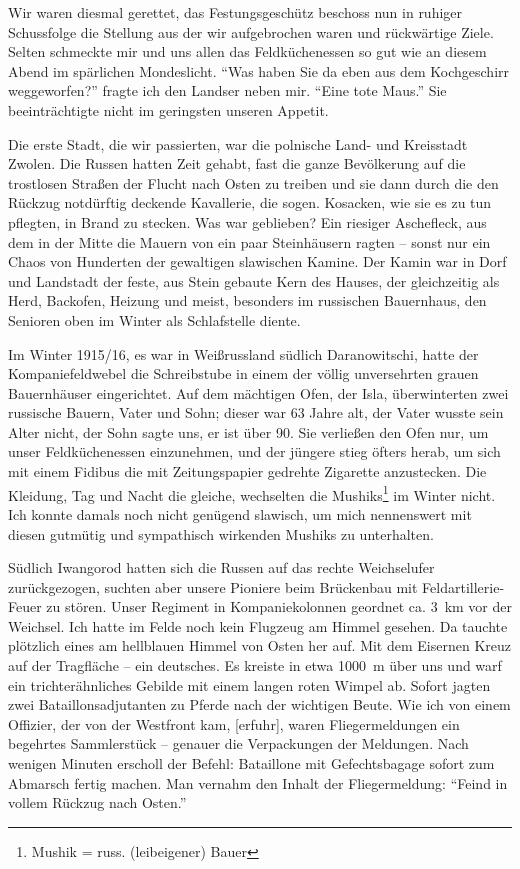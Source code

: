 \documentclass[a5paper,pagesize,10pt,twoside=true]{scrbook}
\begin{document}
Wir waren diesmal gerettet, das Festungsgeschütz beschoss nun in ruhiger Schussfolge die Stellung aus der wir aufgebrochen waren und rückwärtige Ziele. Selten schmeckte mir und uns allen das Feldküchenessen so gut wie an diesem Abend im spärlichen Mondeslicht. \enquote{Was haben Sie da eben aus dem Kochgeschirr weggeworfen?} fragte ich den Landser neben mir. \enquote{Eine tote Maus.} Sie beeinträchtigte nicht im geringsten unseren Appetit.

Die erste Stadt, die wir passierten, war die polnische Land- und Kreisstadt Zwolen. Die Russen hatten Zeit gehabt, fast die ganze Bevölkerung auf die trostlosen Straßen der Flucht nach Osten zu treiben und sie dann durch die den Rückzug notdürftig deckende Kavallerie, die sogen. Kosacken, wie sie es zu tun pflegten, in Brand zu stecken. Was war geblieben? Ein riesiger Aschefleck, aus dem in der Mitte die Mauern von ein paar Steinhäusern ragten -- sonst nur ein Chaos von Hunderten der gewaltigen slawischen Kamine. Der Kamin war in Dorf und Landstadt der feste, aus Stein gebaute Kern des Hauses, der gleichzeitig als Herd, Backofen, Heizung und meist, besonders im russischen Bauernhaus, den Senioren oben im Winter als Schlafstelle diente.

Im Winter 1915/16, es war in Weißrussland südlich Daranowitschi, hatte der Kompaniefeldwebel die Schreibstube in einem der völlig unversehrten grauen Bauernhäuser eingerichtet. Auf dem mächtigen Ofen, der Isla, überwinterten zwei russische Bauern, Vater und Sohn; dieser war 63 Jahre alt, der Vater wusste sein Alter nicht, der Sohn sagte uns, er ist über 90. Sie verließen den Ofen nur, um unser Feldküchenessen einzunehmen, und der jüngere stieg öfters herab, um sich mit einem Fidibus die mit Zeitungspapier gedrehte Zigarette anzustecken. Die Kleidung, Tag und Nacht die gleiche, wechselten die Mushiks\footnote{Mushik = russ. (leibeigener) Bauer} im Winter nicht. Ich konnte damals noch nicht genügend slawisch, um mich nennenswert mit diesen gutmütig und sympathisch wirkenden Mushiks zu unterhalten.

Südlich Iwangorod hatten sich die Russen auf das rechte Weichselufer zurückgezogen, suchten aber unsere Pioniere beim Brückenbau mit Feldartillerie-Feuer zu stören. Unser Regiment in Kompaniekolonnen geordnet ca. 3~km vor der Weichsel. Ich hatte im Felde noch kein Flugzeug am Himmel gesehen. Da tauchte plötzlich eines am hellblauen Himmel von Osten her auf. Mit dem Eisernen Kreuz auf der Tragfläche -- ein deutsches. Es kreiste in etwa 1000~m über uns und warf ein trichterähnliches Gebilde mit einem langen roten Wimpel ab. Sofort jagten zwei Bataillonsadjutanten zu Pferde nach der wichtigen Beute. Wie ich von einem Offizier, der von der Westfront kam, [erfuhr], waren Fliegermeldungen ein begehrtes Sammlerstück -- genauer die Verpackungen der Meldungen. Nach wenigen Minuten erscholl der Befehl: Bataillone mit Gefechtsbagage sofort zum Abmarsch fertig machen. Man vernahm den Inhalt der Fliegermeldung: \enquote{Feind in vollem Rückzug nach Osten.}
\end{document}
